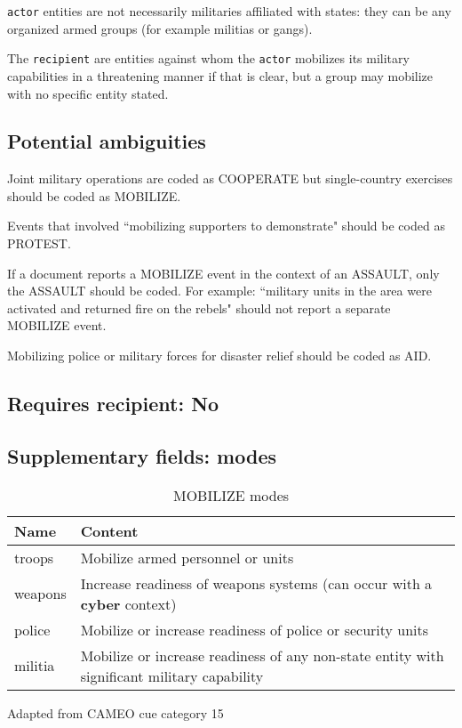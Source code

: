 \documentclass[11pt]{report}
\newcommand{\plcat}[1]{\textsf{#1}}
\newcommand{\plcon}[1]{\textbf{#1}}
\newcommand{\txt}[1]{\texttt{#1}}
\begin{document}
\txt{actor} entities  are not necessarily militaries affiliated with states: they can be any organized armed groups (for example militias or gangs).

The \txt{recipient} are entities against whom the \txt{actor} mobilizes its military capabilities in a threatening manner if that is clear, but a group may mobilize with no specific entity stated.

\subsection{Potential ambiguities}

Joint military operations are coded as \plcat{COOPERATE} but single-country exercises should be coded as \plcat{MOBILIZE}.

Events that involved ``mobilizing supporters to demonstrate" should be coded as \plcat{PROTEST}.

If a document reports a \plcat{MOBILIZE} event in the context of an \plcat{ASSAULT}, only the \plcat{ASSAULT} should be coded. For example: ``military units in the area were activated and returned fire on the rebels" should not report a separate \plcat{MOBILIZE} event.

Mobilizing police or military forces for disaster relief should be coded as \plcat{AID}.

\subsection{Requires recipient: No}

\subsection{Supplementary fields: modes }

\begin{table}[htp]
\caption{MOBILIZE modes}
\begin{center}
\begin{tabular}{|l|p{13cm}|}
\hline
Name & Content \\
\hline
troops & Mobilize armed personnel or units\\
weapons & Increase readiness of weapons systems (can occur with a \plcon{cyber} context) \\
police & Mobilize or increase readiness of police or security units\\
militia & Mobilize or increase readiness of any non-state entity with significant military capability\\
\hline
\end{tabular}
\end{center}
\label{tab:mobilizemode}
Adapted from CAMEO cue category 15
\end{table}
\end{document}
